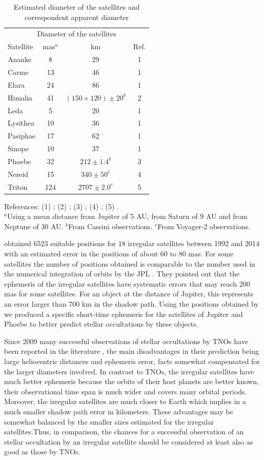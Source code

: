 \documentclass[useAMS,usenatbib]{mn2e}
\begin{document}
\begin{table}
\caption{\label{Tab: satellite-diameter} Estimated diameter of the satellites and correspondent apparent diameter}
\begin{center}
\begin{tabular}{lccc}
\hline  \hline
\multicolumn{4}{c}{Diameter of the satellites} \tabularnewline
Satellite  & mas$^ {a}$  & km & Ref. \tabularnewline
\hline
Ananke & 8 & 29 & 1 \tabularnewline
Carme & 13 & 46 & 1 \tabularnewline
Elara & 24 & 86 & 1 \tabularnewline
Himalia & 41 & $(150\times120) \pm 20^{b}$ & 2 \tabularnewline
Leda & 5 & 20 & 1 \tabularnewline
Lysithea & 10 & 36 & 1 \tabularnewline
Pasiphae & 17 & 62 & 1 \tabularnewline
Sinope & 10 & 37 & 1 \tabularnewline
\hdashline
Phoebe & 32 & $212 \pm 1.4^{b}$ & 3 \tabularnewline
\hdashline
Nereid & 15 & $340 \pm 50^{c}$ & 4 \tabularnewline
Triton & 124 & $2707 \pm 2.0^{c}$ & 5 \tabularnewline
\hline
\end{tabular}
\end{center}
References: (1) \cite{Rettig2001}; (2) \cite{Porco2003}; (3) \cite{Thomas2010}; (4) \cite{Thomas1991}; (5) \cite{Thomas2000}.\\
$^{a}${Using a mean distance from Jupiter of 5 AU, from Saturn of 9 AU and from Neptune of 30 AU.}
$^{b}${From Cassini observations.}
$^{c}${From Voyager-2 observations.}
\par
\end{table}

\cite{GomesJunior2015} obtained 6523 suitable positions for 18 irregular satellites between 1992 and 2014 with an estimated error in the positions of about 60 to 80 mas. For some satellites the number of positions obtained is comparable to the number used in the numerical integration of orbits by the JPL \citep{Jacobson2012}. They pointed out that the ephemeris of the irregular satellites have systematic errors that may reach 200 mas for some satellites. For an object at the distance of Jupiter, this represents an error larger than 700 km in the shadow path. Using the positions obtained by \cite{GomesJunior2015} we produced a specific short-time ephemeris for the satellites of Jupiter and Phoebe to better predict stellar occultations by these objects.

Since 2009 many successful observations of stellar occultations by TNOs have been reported in the literature \citep{Elliot2010, Sicardy2011, Ortiz2012, Braga-Ribas2013}, the main disadvantages in their prediction being large heliocentric distances and ephemeris error, facts somewhat compensated for the larger diameters involved. In contrast to TNOs, the irregular satellites have much better ephemeris because the orbits of their host planets are better  known, their observational time span is much wider and covers many orbital periods. Moreover, the irregular satellites are much closer to Earth which implies in a much smaller shadow path error in kilometers. These advantages may be somewhat balanced by the smaller sizes estimated for the irregular satellites.Thus, in comparison, the chances for a successful observation of an stellar occultation by an irregular satellite should be considered at least also as good as those by TNOs.
\end{document}
